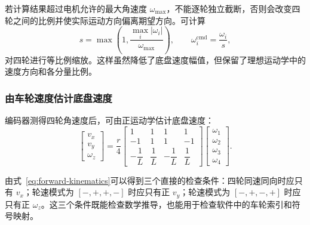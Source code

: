 \documentclass[UTF8,zihao=-4]{ctexart}
\begin{document}
若计算结果超过电机允许的最大角速度 $\omega_{\max}$，不能逐轮独立截断，否则会改变四轮之间的比例并使实际运动方向偏离期望方向。可计算
\begin{equation}
  s=\max\left(1,\frac{\max_i|\omega_i|}{\omega_{\max}}\right),
  \qquad
  \omega_i^{\mathrm{cmd}}=\frac{\omega_i}{s},
  \label{eq:wheel-normalization}
\end{equation}
对四轮进行等比例缩放。这样虽然降低了底盘速度幅值，但保留了理想运动学中的速度方向和各分量比例。

\subsubsection{由车轮速度估计底盘速度}

编码器测得四轮角速度后，可由正运动学估计底盘速度：
\begin{equation}
  \begin{bmatrix}
    v_x\\
    v_y\\
    \omega_z
  \end{bmatrix}
  =
  \frac{r}{4}
  \begin{bmatrix}
    1 & 1 & 1 & 1\\
   -1 & 1 & 1 &-1\\
   -\dfrac{1}{L} & \dfrac{1}{L} & -\dfrac{1}{L} & \dfrac{1}{L}
  \end{bmatrix}
  \begin{bmatrix}
    \omega_1\\
    \omega_2\\
    \omega_3\\
    \omega_4
  \end{bmatrix}.
  \label{eq:forward-kinematics}
\end{equation}

由式~\eqref{eq:forward-kinematics}可以得到三个直接的检查条件：四轮同速同向时应只有 $v_x$；轮速模式为 $[-,+,+,-]$ 时应只有正 $v_y$；轮速模式为 $[-,+,-,+]$ 时应只有正 $\omega_z$。这三个条件既能检查数学推导，也能用于检查软件中的车轮索引和符号映射。
\end{document}
